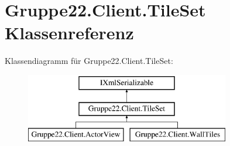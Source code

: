 \hypertarget{class_gruppe22_1_1_client_1_1_tile_set}{\section{Gruppe22.\-Client.\-Tile\-Set Klassenreferenz}
\label{class_gruppe22_1_1_client_1_1_tile_set}
}
Klassendiagramm für Gruppe22.\-Client.\-Tile\-Set\-:\begin{figure}[H]
\begin{center}
\leavevmode
\includegraphics[height=3.000000cm]{class_gruppe22_1_1_client_1_1_tile_set}
\end{center}
\end{figure}
